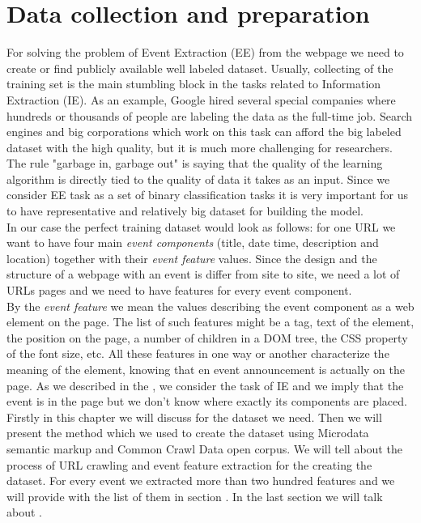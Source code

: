 \chapter{Data collection and preparation}
\label{chap:datacollect}

For solving the problem of Event Extraction (EE) from the webpage we need to create or find publicly available well labeled dataset. Usually, collecting of the training set is the main stumbling block in the tasks related to Information Extraction (IE). As an example, Google hired several special companies where hundreds or thousands of people are labeling the data as the full-time job. Search engines and big corporations which work on this task can afford the big labeled dataset with the high quality, but it is much more challenging for researchers. The rule "garbage in, garbage out" is saying that the quality of the learning algorithm is directly tied to the quality of data it takes as an input. Since we consider EE task as a set of binary classification tasks it is very important for us to have representative and relatively big dataset for building the model. \\

In our case the perfect training dataset would look as follows: for one URL we want to have four main \textit{event components} (title, date time, description and location) together with their \textit{event feature} values. Since the design and the structure of a webpage with an event is differ from site to site, we need a lot of URLs pages and we need to have features for every event component. \\

By the \textit{event feature} we mean the values describing the event component as a web element on the page. The list of such features might be a tag, text of the element, the position on the page, a number of children in a DOM tree, the CSS property of the font size, etc. All these features in one way or another characterize the meaning of the element, knowing that en event announcement is actually on the page. As we described in the , we consider the task of IE and we imply that the event is in the page but we don't know where exactly its components are placed. \\

Firstly in this chapter we will discuss  for the dataset we need. Then we will present the method which we used to create the dataset using Microdata semantic markup and Common Crawl Data open corpus. We will tell about the process of URL crawling and event feature extraction for the creating the dataset. For every event we extracted more than two hundred features and we will provide with the list of them in section . In the last section we will talk about .


